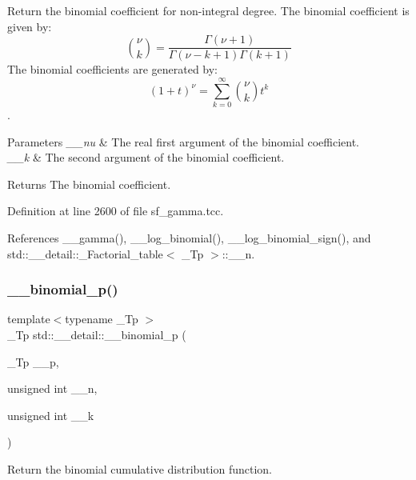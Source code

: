 Return the binomial coefficient for non-\/integral degree. The binomial coefficient is given by\+: \[ \binom{\nu}{k} = \frac{\Gamma(\nu+1)}{\Gamma(\nu-k+1) \Gamma(k+1)} \] The binomial coefficients are generated by\+: \[ \left(1 + t\right)^\nu = \sum_{k=0}^\infty \binom{\nu}{k} t^k \]. 


\begin{DoxyParams}{Parameters}
{\em \+\_\+\+\_\+nu} & The real first argument of the binomial coefficient. \\
\hline
{\em \+\_\+\+\_\+k} & The second argument of the binomial coefficient. \\
\hline
\end{DoxyParams}
\begin{DoxyReturn}{Returns}
The binomial coefficient. 
\end{DoxyReturn}


Definition at line 2600 of file sf\+\_\+gamma.\+tcc.



References \+\_\+\+\_\+gamma(), \+\_\+\+\_\+log\+\_\+binomial(), \+\_\+\+\_\+log\+\_\+binomial\+\_\+sign(), and std\+::\+\_\+\+\_\+detail\+::\+\_\+\+Factorial\+\_\+table$<$ \+\_\+\+Tp $>$\+::\+\_\+\+\_\+n.

\mbox{\label{namespacestd_1_1____detail_a6efd57f8f3b9ea42df29de116db6081b}} 
\subsubsection{\texorpdfstring{\+\_\+\+\_\+binomial\+\_\+p()}{\_\_binomial\_p()}}
{\footnotesize\ttfamily template$<$typename \+\_\+\+Tp $>$ \\
\+\_\+\+Tp std\+::\+\_\+\+\_\+detail\+::\+\_\+\+\_\+binomial\+\_\+p (\begin{DoxyParamCaption}\item[{\+\_\+\+Tp}]{\+\_\+\+\_\+p,  }\item[{unsigned int}]{\+\_\+\+\_\+n,  }\item[{unsigned int}]{\+\_\+\+\_\+k }\end{DoxyParamCaption})}



Return the binomial cumulative distribution function. 

